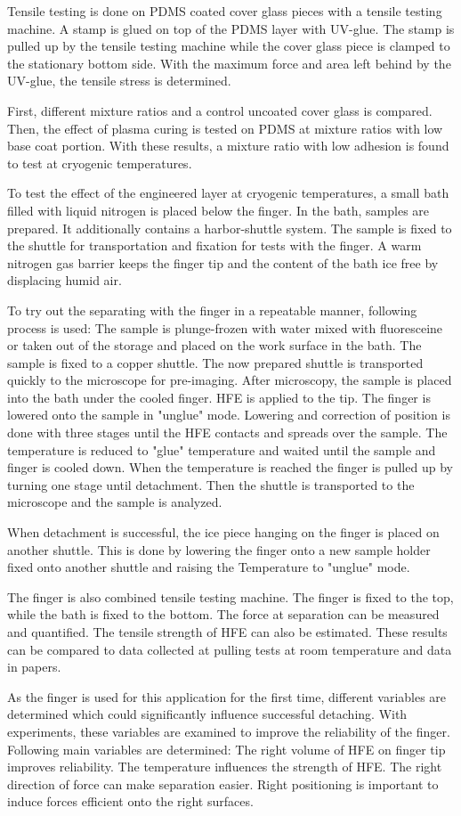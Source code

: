 Tensile testing is done on PDMS coated cover glass pieces with a tensile testing machine. A stamp is glued on top of the PDMS layer with UV-glue. The stamp is pulled up by the tensile testing machine while the cover glass piece is clamped to the stationary bottom side. With the maximum force and area left behind by the UV-glue, the tensile stress is determined.

First, different mixture ratios and  a control uncoated cover glass is compared. Then, the effect of plasma curing is tested on PDMS at mixture ratios with low base coat portion. With these results, a mixture ratio with low adhesion is found to test at cryogenic temperatures. 

To test the effect of the engineered layer at cryogenic temperatures, a small bath filled with liquid nitrogen is placed below the finger. In the bath, samples are prepared. It additionally contains a harbor-shuttle system. The sample is fixed to the shuttle for transportation and fixation for tests with the finger. A warm nitrogen gas barrier keeps the finger tip and the content of the bath ice free by displacing humid air.

To try out the separating with the finger in a repeatable manner, following process is used: The sample is plunge-frozen with water mixed with fluoresceine or taken out of the storage and placed on the work surface in the bath. The sample is fixed to a copper shuttle. The now prepared shuttle is transported quickly to the microscope for pre-imaging. After microscopy, the sample is placed into the bath under the cooled finger. HFE is applied to the tip. The finger is lowered onto the sample in "unglue" mode. Lowering and correction of position is done with three stages until the HFE contacts and spreads over the sample. The temperature is reduced to "glue" temperature and waited until the sample and finger is cooled down. When the temperature is reached the finger is pulled up by turning one stage until detachment. Then the shuttle is transported to the microscope and the sample is analyzed.

When detachment is successful, the ice piece hanging on the finger is placed on another shuttle. This is done by lowering the finger onto a new sample holder fixed onto another shuttle and raising the Temperature to "unglue" mode.

The finger is also combined tensile testing machine. The finger is fixed to the top, while the bath is fixed to the bottom. The force at separation can be measured and quantified. The tensile strength of HFE can also be estimated. These results can be compared to data collected at pulling tests at room temperature and data in papers.

As the finger is used for this application for the first time, different variables are determined which could significantly influence successful detaching. With experiments, these variables are examined to improve the reliability of the finger. Following main variables are determined: The right volume of HFE on finger tip improves reliability. The temperature influences the strength of HFE. The right direction of force can make separation easier. Right positioning is important to induce forces efficient onto the right surfaces.
